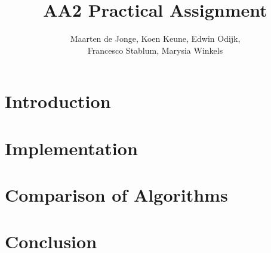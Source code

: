 \documentclass[a4paper, 12pt]{article}
\begin{document}
\title{AA2 Practical Assignment}
\author{Maarten de Jonge, Koen Keune, Edwin Odijk,\\ Francesco Stablum, Marysia Winkels}
\maketitle

\section*{Introduction}

\section*{Implementation} 

\section*{Comparison of Algorithms}

\section*{Conclusion}
\end{document}
